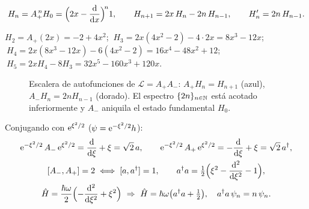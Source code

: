 \documentclass[11pt,a4paper,twoside]{article}
\newcommand{\Lop}{\mathcal{L}}
\newcommand{\Ap}{A_{+}}
\newcommand{\Am}{A_{-}}
\begin{document}
\begin{corolario}[Recurrencias]
\begin{equation}
H_n=\Ap^{\,n}H_0=\Bigl(2x-\dv{}{x}\Bigr)^{\!n}1,\qquad
H_{n+1}=2x\,H_n-2n\,H_{n-1},\qquad H_n'=2n\,H_{n-1}.
\end{equation}
\end{corolario}

\begin{ejemplo}
$H_2=\Ap(2x)=-2+4x^2$;
$\ H_3=2x(4x^2-2)-4\cdot2x=8x^3-12x$;
$\ H_4=2x(8x^3-12x)-6(4x^2-2)=16x^4-48x^2+12$;
$\ H_5=2xH_4-8H_3=32x^5-160x^3+120x$.
\end{ejemplo}

\begin{figure}[ht]
\centering
{}
\caption{Escalera de autofunciones de $\Lop=\Ap\Am$: $\Ap H_n=H_{n+1}$ (azul), $\Am H_n=2nH_{n-1}$ (dorado).
El espectro $\{2n\}_{n\in\mathbb{N}}$ está acotado inferiormente y $\Am$ aniquila el estado fundamental $H_0$.}
\label{fig:escalera}
\end{figure}

\begin{observacion}
Conjugando con $\mathrm{e}^{\xi^2/2}$ ($\psi=\mathrm{e}^{-\xi^2/2}h$):
\begin{gather}
\e^{-\xi^2/2}\,\Am\,\e^{\xi^2/2}=\dv{}{\xi}+\xi=\sqrt2\,a,\qquad
\e^{-\xi^2/2}\,\Ap\,\e^{\xi^2/2}=-\dv{}{\xi}+\xi=\sqrt2\,a^\dagger,\notag\\
[\Am,\Ap]=2\iff[a,a^\dagger]=1,\qquad
a^\dagger a=\tfrac12\Bigl(\xi^2-\dvn{}{\xi}{2}-1\Bigr),\notag\\
\hat H=\frac{\hbar\omega}{2}\Bigl(-\dvn{}{\xi}{2}+\xi^2\Bigr)\ \Rightarrow\ \hat H=\hbar\omega\bigl(a^\dagger a+\tfrac12\bigr),\quad a^\dagger a\,\psi_n=n\,\psi_n .
\end{gather}
\end{observacion}
\end{document}

